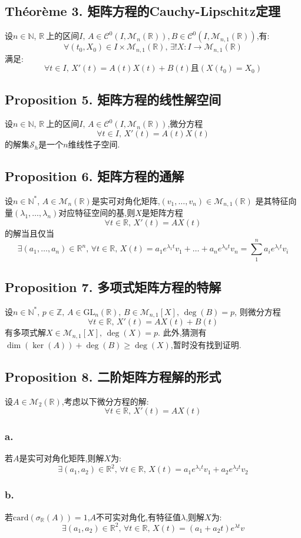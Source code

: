 \documentclass[12pt, a4paper, oneside]{ctexbook}
\newcommand{\card }{\text{card}}%
\newcommand{\R }{\mathbb{R}}%
\newcommand{\RR }{$\R\ $}%
\newcommand{\N }{\mathbb{N}}%
\newcommand{\C }{\mathcal{C}}%
\newcommand{\M }{\mathcal{M}}%
\newcommand{\n }{$n$}\newcommand{\f  }{$ f $}
\begin{document}
  \subsection{Théorème 3. 矩阵方程的Cauchy-Lipschitz定理}
  设$n\in\N$, \RR 上的区间$I,\,A\in\C^0(I,\M_n(\R)),B\in\C^0(I,\M_{n,1}(\R))$,有:
  $$
  \forall(t_0,X_0)\in I\times\M_{n,1}(\R),\,\exists!X:I\rightarrow\M_{n,1}(\R)
  $$
  满足:
  $$
  \forall t\in I,\,X'(t)=A(t)X(t)+B(t)\text{且} (X(t_0)=X_0)
  $$
  \subsection{Proposition 5. 矩阵方程的线性解空间}
  设$n\in\N$, \RR 上的区间$I,\,A\in\C^0(I,\M_n(\R))$,微分方程
  $$
  \forall t\in I,\,X'(t)=A(t)X(t)
  $$
  的解集$\mathcal{S}_h$是一个\n 维线性子空间.
  \subsection{Proposition 6. 矩阵方程的通解}
  设$n\in\N^*$, $A\in\M_n(\R)$是实可对角化矩阵,$(v_1,\dots,v_n)\in\M_{n,1}(\R)$
  是其特征向量$(\lambda_1,\dots,\lambda_n)$对应特征空间的基,则$X$是矩阵方程
  $$
  \forall t\in\R,\,X'(t)=AX(t)
  $$
  的解当且仅当
  $$
  \exists(a_1,\dots,a_n)\in\R^n,\,\forall t\in\R,\,X(t)=a_1e^{\lambda_1t}v_1+\dots+a_ne^{\lambda_nt}v_n=\sum_{1}^{n}a_ie^{\lambda_it}v_i
  $$
  \subsection{Proposition 7. 多项式矩阵方程的特解}
  设$n\in\N^*,\,p\in\mathbb{Z},\,A\in\text{GL}_n(\R),\,B\in\M_{n,1}[X],\,\deg(B)=p$,
  则微分方程
  $$
    \forall t\in\R,\,X'(t)=AX(t)+B(t)
  $$
  有多项式解$X\in\M_{n,1}[X],\,\deg(X)=p$.
  此外,猜测有$\dim(\ker(A))+\deg(B)\ge\deg(X)$,暂时没有找到证明.
  \subsection{Proposition 8. 二阶矩阵方程解的形式}
  设$A\in\M_2(\R)$,考虑以下微分方程的解:
  $$
  \forall t\in\R,\,X'(t)=AX(t)
  $$
  \subsubsection{a.}
  若$A$是实可对角化矩阵,则解$X$为:
  $$
    \exists(a_1,a_2)\in\R^2,\,\forall t\in\R,\,X(t)=a_1e^{\lambda_1t}v_1+a_2e^{\lambda_2t}v_2
  $$
  \subsubsection{b.}
  若$\card(\sigma_\R(A))=1$,$A$不可实对角化,有特征值$\lambda$,则解$X$为:
  $$
    \exists(a_1,a_2)\in\R^2,\,\forall t\in\R,\,X(t)=(a_1+a_2t)e^{\lambda t}v
  $$
\end{document}
